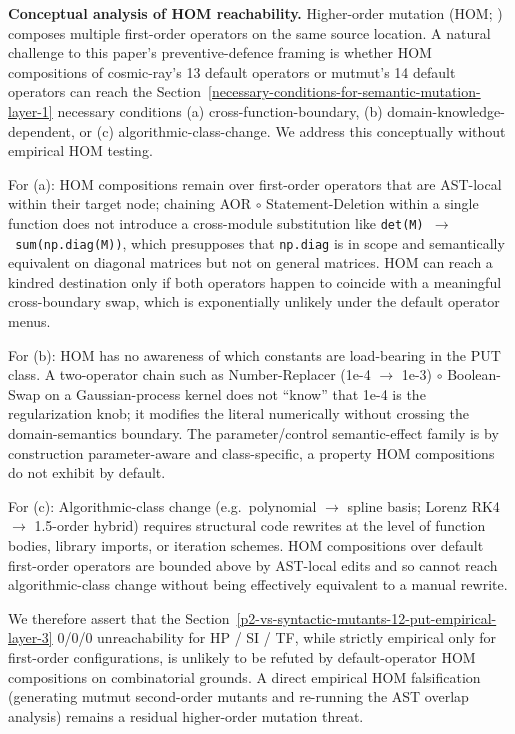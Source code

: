 \documentclass[manuscript,screen,review]{acmart}
\begin{document}
\textbf{Conceptual analysis of HOM reachability.} Higher-order mutation
(HOM; \citealp{jia2008subtle,c03829bdd1a6e45113092384bf0fa05a064ca54a,kintis2018effective}) composes multiple first-order operators on the same
source location. A natural challenge to this paper's preventive-defence
framing is whether HOM compositions of cosmic-ray's
13 default operators or mutmut's 14 default operators can reach the Section~\ref{necessary-conditions-for-semantic-mutation-layer-1}
necessary conditions (a) cross-function-boundary, (b)
domain-knowledge-dependent, or (c) algorithmic-class-change. We address
this conceptually without empirical HOM testing.

For (a): HOM compositions remain over first-order operators that are
AST-local within their target node; chaining AOR $\circ$ Statement-Deletion
within a single function does not introduce a cross-module substitution
like \texttt{det(M)\ $\to$\ sum(np.diag(M))}, which presupposes that
\texttt{np.diag} is in scope and semantically equivalent on diagonal
matrices but not on general matrices. HOM can reach a kindred
destination only if both operators happen to coincide with a meaningful
cross-boundary swap, which is exponentially unlikely under the default
operator menus.

For (b): HOM has no awareness of which constants are load-bearing in the
PUT class. A two-operator chain such as Number-Replacer (1e-4 $\to$ 1e-3) $\circ$
Boolean-Swap on a Gaussian-process kernel does not ``know'' that 1e-4 is
the regularization knob; it modifies the literal numerically without
crossing the domain-semantics boundary. The parameter/control
semantic-effect family is by construction parameter-aware and
class-specific, a property HOM compositions do not exhibit by default.

For (c): Algorithmic-class change (e.g.~polynomial $\to$ spline basis;
Lorenz RK4 $\to$ 1.5-order hybrid) requires structural code rewrites at the
level of function bodies, library imports, or iteration schemes. HOM
compositions over default first-order operators are bounded above by
AST-local edits and so cannot reach algorithmic-class change without
being effectively equivalent to a manual rewrite.

We therefore assert that the Section~\ref{p2-vs-syntactic-mutants-12-put-empirical-layer-3} 0/0/0 unreachability for HP / SI / TF,
while strictly empirical only for first-order configurations, is
unlikely to be refuted by default-operator HOM compositions on
combinatorial grounds. A direct empirical HOM falsification (generating
mutmut second-order mutants and re-running the AST overlap analysis)
remains a residual higher-order mutation threat.
\end{document}
